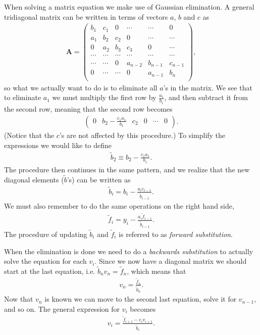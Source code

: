 \documentclass[12pt, a4paper]{article}
\begin{document}
When solving a matrix equation we make use of Gaussian elimination. A general tridiagonal matrix can be 
written in terms of vectors $a$, $b$ and $c$ as  
\begin{align*}
\mathbf{A} = \left(\begin{array}{cccccc}
b_1 & c_1 & 0 & \cdots & \cdots & 0 \\ 
a_1 & b_2 & c_2 & 0 & \cdots & \cdots \\ 
0 & a_2 & b_3 & c_3 & 0 & \cdots \\
\cdots & \cdots & \cdots & \cdots & \cdots & \cdots \\              
\cdots & \cdots  & 0 & a_{n-2} & b_{n-1} & c_{n-1} \\ 
0 & \cdots & \cdots & 0 & a_{n-1} & b_n \\  
\end{array} \right), 
\end{align*}
so what we actually want to do is to eliminate all $a$'s in the matrix. We see that to eliminate $a_1$ 
we must multiply the first row by $\frac{a_1}{b_1}$, and then subtract it from the second row, meaning that 
the second row becomes 
\begin{align*}
\left( \begin{array}{cccccc}
0 & b_2 - \frac{c_1 a_1}{b_1} & c_2 & 0 & \cdots & 0 
\end{array} \right). 
\end{align*}
(Notice that the $c$'s are not affected by this procedure.)  
To simplify the expressions we would like to define 
\begin{align*}
\tilde{b}_2 \equiv b_2 - \frac{c_1 a_1}{b_1}.  
\end{align*}
The procedure then continues in the same pattern, and we realize that the new diagonal elements 
($\tilde{b}$'s) can be written as   
\begin{align}
\tilde{b}_i = b_i - \frac{a_i c_{i-1}}{\tilde{b}_{i-1}}. 
\label{btilde}
\end{align}
We must also remember to do the same operations on the right hand side, 
\begin{align}
\tilde{f}_i = y_i - \frac{a_i \tilde{f}_{i-1}}{\tilde{b}_{i-1}}. 
\label{ftilde}
\end{align}
The procedure of updating $\tilde{b}_i$ and $\tilde{f}_i$ is referred to as \textit{forward substitution}. 

When the elimination is done we need to do a \textit{backwards substitution} to actually solve the 
equation for each $v_i$. Since we now have a diagonal matrix we should start at the last equation, i.e. 
$\tilde{b}_n v_n = \tilde{f}_n$, which means that 
\begin{align*}
v_n = \frac{\tilde{f}_n}{\tilde{b}_n}. 
\end{align*} 
Now that $v_n$ is known we can move to the second last equation, solve it for $v_{n-1}$, and so on. The 
general expression for $v_i$ becomes 
\begin{align*}
v_i = \frac{\tilde{f}_{i+1} - c_i v_{i+1}}{\tilde{b}_i}.
\label{vi} 
\end{align*}
\end{document}
